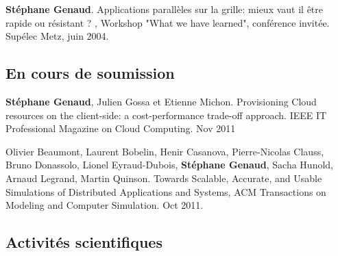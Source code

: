 \documentclass[11pt]{article}
\begin{document}
\begin{thebibliography}{99}
\textbf{Stéphane Genaud}.
\newblock Applications parallèles sur la grille: mieux vaut il être rapide ou résistant ? 
, Workshop "What we have learned", conférence invitée.
\newblock Supélec Metz, juin 2004. 

\subsection*{En cours de soumission}

\newblock \textbf{Stéphane Genaud}, Julien Gossa et Etienne Michon.
\newblock Provisioning Cloud resources on the client-side: a cost-performance trade-off approach.
IEEE IT Professional Magazine on Cloud Computing. Nov 2011

Olivier Beaumont, Laurent Bobelin, Henir Casanova, Pierre-Nicolas Clauss, 
Bruno Donassolo, Lionel Eyraud-Dubois, \textbf{Stéphane Genaud}, Sacha Hunold, 
Arnaud Legrand, Martin Quinson.
\newblock
Towards Scalable, Accurate, and Usable Simulations of Distributed Applications and Systems,
ACM Transactions on Modeling and Computer Simulation. Oct 2011.
\end{thebibliography}


\subsection{Activités scientifiques}
\end{document}

